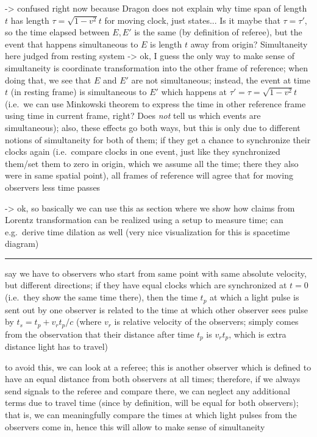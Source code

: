 -> confused right now because Dragon does not explain why time span of length $t$ has length $\tau = \sqrt{1 - v^2} t$ for moving clock, just states... Is it maybe that $\tau = \tau'$, so the time elapsed between $E, E'$ is the same (by definition of referee), but the event that happens simultaneous to $E$ is length $t$ away from origin? Simultaneity here judged from resting system -> ok, I guess the only way to make sense of simultaneity is coordinate transformation into the other frame of reference; when doing that, we see that $E$ and $E'$ are not simultaneous; instead, the event at time $t$ (in resting frame) is simultaneous to $E'$ which happens at $\tau' = \tau = \sqrt{1 - v^2} t$ (i.e.~we can use Minkowski theorem to express the time in other reference frame using time in current frame, right? Does \emph{not} tell us which events are simultaneous); also, these effects go both ways, but this is only due to different notions of simultaneity for both of them; if they get a chance to synchronize their clocks again (i.e.~compare clocks in one event, just like they synchronized them/set them to zero in origin, which we assume all the time; there they also were in same spatial point), all frames of reference will agree that for moving observers less time passes


-> ok, so basically we can use this as section where we show how claims from Lorentz transformation can be realized using a setup to measure time; can e.g.~derive time dilation as well (very nice visualization for this is spacetime diagram)


\hrule



say we have to observers who start from same point with same absolute velocity, but different directions; if they have equal clocks which are synchronized at $t = 0$ (i.e.~they show the same time there), then the time $t_p$ at which a light pulse is sent out by one observer is related to the time at which other observer sees pulse by $t_s = t_p + v_r t_p / c$ (where $v_r$ is relative velocity of the observers; simply comes from the observation that their distance after time $t_p$ is $v_r t_p$, which is extra distance light has to travel)

to avoid this, we can look at a referee; this is another observer which is defined to have an equal distance from both observers at all times; therefore, if we always send signals to the referee and compare there, we can neglect any additional terms due to travel time (since by definition, will be equal for both observers); that is, we can meaningfully compare the times at which light pulses from the observers come in, hence this will allow to make sense of simultaneity

